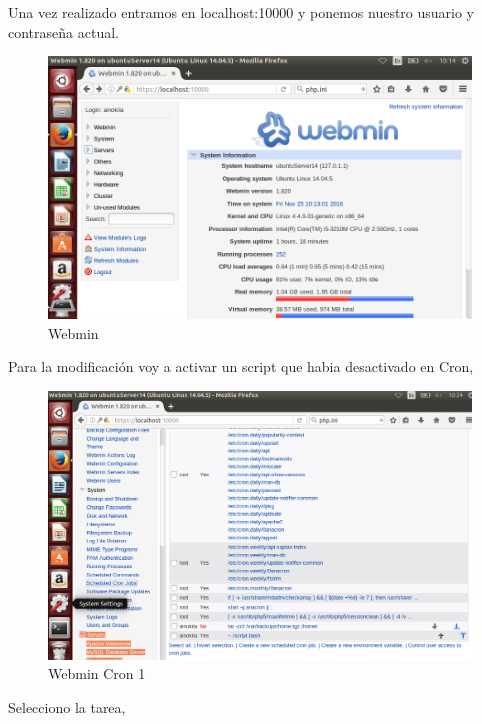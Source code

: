 Una vez realizado entramos en localhost:10000 y ponemos nuestro usuario y contraseña actual.

	\begin{figure}[H]
	\centering
	\includegraphics[scale=0.35]{pics/webmin1.png}
	\caption{Webmin} \label{fig:web_min}
	\end{figure}

Para la modificación voy a activar un script que habia desactivado en Cron,

	\begin{figure}[H]
	\centering
	\includegraphics[scale=0.35]{pics/cron1.png}
	\caption{Webmin Cron 1} \label{fig:web_cron1}
	\end{figure}

Selecciono la tarea,

